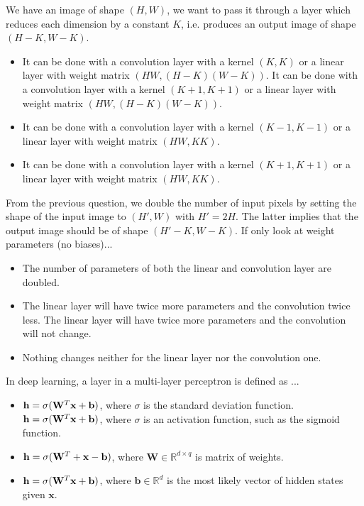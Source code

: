 \documentclass[11pt, a4paper]{article}
\begin{document}
We have an image of shape $(H, W)$, we want to pass it through a layer which reduces each dimension by a constant $K$, i.e. produces an output image of shape $(H-K, W-K)$.
\begin{itemize}
    \item It can be done with a convolution layer with a kernel $(K, K)$ or a linear layer with weight matrix $(HW, (H-K)(W-K))$.
    \solitem It can be done with a convolution layer with a kernel $(K + 1, K + 1)$ or a linear layer with weight matrix $(HW, (H-K)(W-K))$.
    \item It can be done with a convolution layer with a kernel $(K - 1, K - 1)$ or a linear layer with weight matrix $(HW, KK)$.
    \item It can be done with a convolution layer with a kernel $(K+ 1, K+1)$ or a linear layer with weight matrix $(HW, KK)$.
\end{itemize}

From the previous question, we double the number of input pixels by setting the shape of the input image to $(H', W)$ with $H' = 2H$. The latter implies that the output image should be of shape $(H' - K, W - K)$. If only look at weight parameters (no biases)...
\begin{itemize}
    \item The number of parameters of both the linear and convolution layer are doubled. 
    \item The linear layer will have twice more parameters and the convolution twice less.
    \solitem The linear layer will have twice more parameters and the convolution will not change.
    \item Nothing changes neither for the linear layer nor the convolution one.
\end{itemize}

In deep learning, a layer in a multi-layer perceptron is defined as ... 
\begin{itemize}
    \item ${\bf h} = \sigma(\mathbf{W}^T\mathbf{x} + \mathbf{b})$, where $\sigma$ is the standard deviation function.
    \solitem ${\bf h} = \sigma(\mathbf{W}^T\mathbf{x} + \mathbf{b})$, where $\sigma$ is an activation function, such as the sigmoid function.
    \item ${\bf h} = \sigma(\mathbf{W}^T + \mathbf{x} - \mathbf{b})$, where $\mathbf{W} \in \mathbb{R}^{d \times q}$ is matrix of weights.
    \item ${\bf h} = \sigma(\mathbf{W}^T\mathbf{x} + \mathbf{b})$, where $\mathbf{b} \in \mathbb{R}^d$ is the most likely vector of hidden states given $\mathbf{x}$.  
\end{itemize}
\end{document}
